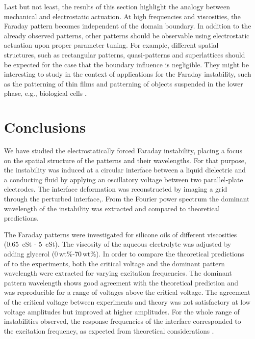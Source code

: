 \documentclass{jfm_arxiv}
\begin{document}
Last but not least, the results of this section highlight the analogy between mechanical and electrostatic actuation. At high frequencies and viscosities, the Faraday pattern becomes independent of the domain boundary. In addition to the already observed patterns, other patterns should be observable using electrostatic actuation upon proper parameter tuning. For example, different spatial structures, such as rectangular patterns, quasi-patterns \citep{Edwards1994} and superlattices \citep{Douady1990, Kahouadji2015} should be expected for the case that the boundary influence is negligible. They might be interesting to study in the context of applications for the Faraday instability, such as the patterning of thin films \citep{Zhao2019} and patterning of objects suspended in the lower phase, e.g., biological cells \citep{Chen2017}. 

\section{Conclusions}
\label{sec:conclusion}

We have studied the electrostatically forced Faraday instability, placing a focus on the spatial structure of the patterns and their wavelengths. 
For that purpose, the instability was induced at a circular interface between a liquid dielectric and a conducting fluid by applying an oscillatory voltage between two parallel-plate electrodes. 
The interface deformation was reconstructed by imaging a grid through the perturbed interface,. 
From the Fourier power spectrum the dominant wavelength of the instability was extracted and compared to theoretical predictions.

The Faraday patterns were investigated for silicone oils of different viscosities (\SI{0.65}{\centi St} - \SI{5}{\centi St}). The viscosity of the aqueous electrolyte was adjusted by adding glycerol (0\,wt\%-70\,wt\%). 
In order to compare the theoretical predictions of \citet{Bandopadhyay2017} to the experiments, both the critical voltage and the dominant pattern wavelength were extracted for varying excitation frequencies.
The dominant pattern wavelength shows good agreement with the theoretical prediction and was reproducible for a range of voltages above the critical voltage. 
The agreement of the critical voltage between experiments and theory was not satisfactory at low voltage amplitudes but improved at higher amplitudes. 
For the whole range of instabilities observed, the response frequencies of the interface corresponded to the excitation frequency, as expected from theoretical considerations \citep{Bandopadhyay2017, Ward2019}.
\end{document}
